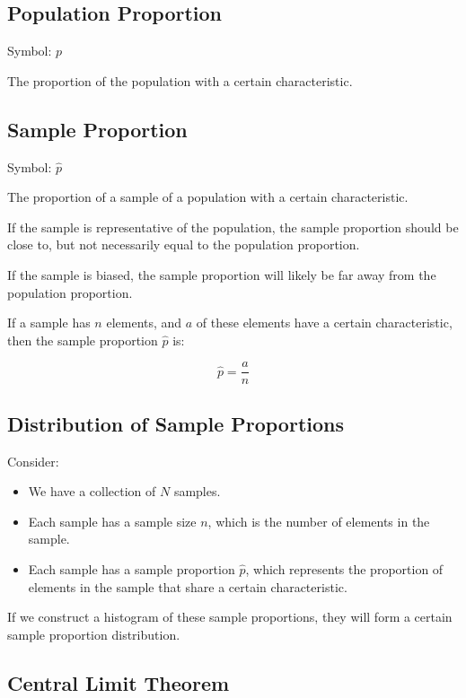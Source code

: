 \documentclass[a4paper,11pt]{article}
\begin{document}
\subsection{Population Proportion}

Symbol: $p$

The proportion of the population with a certain characteristic.

\subsection{Sample Proportion}

Symbol: $\hat{p}$

The proportion of a sample of a population with a certain characteristic.

If the sample is representative of the population, the sample proportion should
be close to, but not necessarily equal to the population proportion.

If the sample is biased, the sample proportion will likely be far away from the
population proportion.

If a sample has $n$ elements, and $a$ of these elements have a certain
characteristic, then the sample proportion $\hat{p}$ is:

$$
\hat{p} = \frac{a}{n}
$$

\subsection{Distribution of Sample Proportions}

Consider:

\begin{itemize}
\item We have a collection of $N$ samples.
\item Each sample has a sample size $n$, which is the number of elements in the
	sample.
\item Each sample has a sample proportion $\hat{p}$, which represents the
	proportion of elements in the sample that share a certain characteristic.
\end{itemize}

If we construct a histogram of these sample proportions, they will form a
certain sample proportion distribution.

\subsection{Central Limit Theorem}
\end{document}
